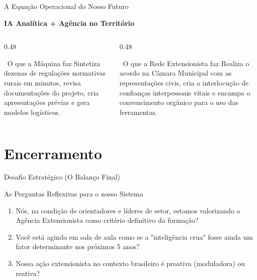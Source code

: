 \documentclass[aspectratio=169,12pt]{beamer}
\begin{document}
\begin{frame}{A Equação Operacional do Nosso Futuro}
    \begin{center}
        \textbf{\Huge IA Analítica + Agência no Território}
    \end{center}
    
    \vspace{0.5cm}
    \begin{columns}
        \begin{column}{0.48\textwidth}
            \begin{block}{\faRobot\, O que a Máquina faz}
                Sintetiza dezenas de regulações normativas rurais em minutos, revisa documentações do projeto, cria apresentações prévias e gera modelos logísticos.
            \end{block}
        \end{column}
        
        \begin{column}{0.48\textwidth}
            \begin{block}{\faCommentDots\, O que a Rede Extensionista faz}
                Realiza o acordo na Câmara Municipal com as representações civis, cria a interlocução de confianças interpessoais vitais e encampa o convencimento orgânico para o uso das ferramentas.
            \end{block}
        \end{column}
    \end{columns}
\end{frame}


\section{Encerramento}

\begin{frame}{Desafio Estratégico (O Balanço Final)}
    \begin{alertblock}{As Perguntas Reflexivas para o nosso Sistema}
        \begin{enumerate}
            \item Nós, na condição de orientadores e líderes de setor, estamos valorizando a Agência Extensionista como critério definitivo da formação?
            \item Você está agindo em sala de aula como se a "inteligência crua" fosse ainda um fator determinante nos próximos 5 anos?
            \item Nossa ação extensionista no contexto brasileiro é proativa (moduladora) ou reativa?
        \end{enumerate}
    \end{alertblock}
\end{frame}
\end{document}

